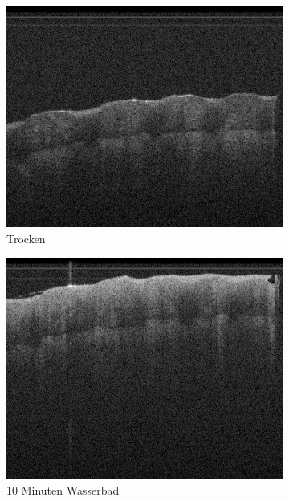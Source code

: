 \documentclass[german, %
parskip=full, %
bibliography=totoc, %
]{scrartcl}
\begin{document}
\begin{figure}[ht]
	\centering
	\begin{subfigure}[b]{0.3\textwidth}
	   \includegraphics[width=\textwidth]{finger_creme_1}
		 \caption{Trocken}
	\end{subfigure}
	\begin{subfigure}[b]{0.3\textwidth}
	   \includegraphics[width=\textwidth]{finger_creme_2}
		 \caption{10 Minuten Wasserbad}
	\end{subfigure}
	\begin{subfigure}[b]{0.3\textwidth}

\end{subfigure}
\end{figure}
\end{document}
